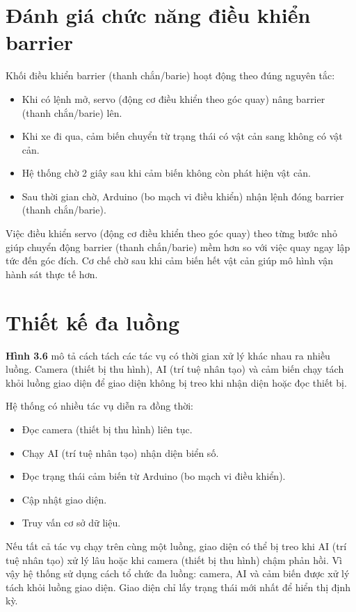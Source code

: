 \documentclass[a4paper,14pt]{extreport}
\begin{document}
\section{Đánh giá chức năng điều khiển barrier}

Khối điều khiển barrier (thanh chắn/barie) hoạt động theo đúng nguyên tắc:

\begin{itemize}[leftmargin=2em]
  \item Khi có lệnh mở, servo (động cơ điều khiển theo góc quay) nâng barrier (thanh chắn/barie) lên.
  \item Khi xe đi qua, cảm biến chuyển từ trạng thái có vật cản sang không có vật cản.
  \item Hệ thống chờ 2 giây sau khi cảm biến không còn phát hiện vật cản.
  \item Sau thời gian chờ, Arduino (bo mạch vi điều khiển) nhận lệnh đóng barrier (thanh chắn/barie).
\end{itemize}
Việc điều khiển servo (động cơ điều khiển theo góc quay) theo từng bước nhỏ giúp chuyển động barrier (thanh chắn/barie) mềm hơn so với việc quay ngay lập tức đến góc đích. Cơ chế chờ sau khi cảm biến hết vật cản giúp mô hình vận hành sát thực tế hơn.

\section{Thiết kế đa luồng}

\textbf{Hình 3.6} mô tả cách tách các tác vụ có thời gian xử lý khác nhau ra nhiều luồng. Camera (thiết bị thu hình), AI (trí tuệ nhân tạo) và cảm biến chạy tách khỏi luồng giao diện để giao diện không bị treo khi nhận diện hoặc đọc thiết bị.

Hệ thống có nhiều tác vụ diễn ra đồng thời:

\begin{itemize}[leftmargin=2em]
  \item Đọc camera (thiết bị thu hình) liên tục.
  \item Chạy AI (trí tuệ nhân tạo) nhận diện biển số.
  \item Đọc trạng thái cảm biến từ Arduino (bo mạch vi điều khiển).
  \item Cập nhật giao diện.
  \item Truy vấn cơ sở dữ liệu.
\end{itemize}
Nếu tất cả tác vụ chạy trên cùng một luồng, giao diện có thể bị treo khi AI (trí tuệ nhân tạo) xử lý lâu hoặc khi camera (thiết bị thu hình) chậm phản hồi. Vì vậy hệ thống sử dụng cách tổ chức đa luồng: camera, AI và cảm biến được xử lý tách khỏi luồng giao diện. Giao diện chỉ lấy trạng thái mới nhất để hiển thị định kỳ.
\end{document}
